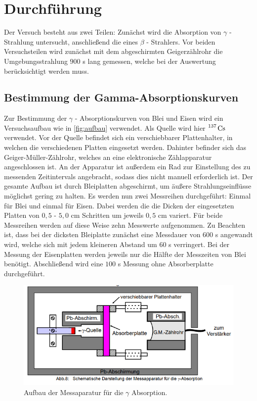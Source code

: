 \section{Durchführung}
\label{sec:Durchführung}
Der Versuch besteht aus zwei Teilen: Zunächst wird die Absorption von $\gamma$ - Strahlung untersucht, anschließend die eines $\beta$ - Strahlers.
Vor beiden Versuchsteilen wird zunächst mit dem abgeschirmten Geigerzählrohr die Umgebungsstrahlung $900$ s lang gemessen, welche bei der Auswertung 
berücksichtigt werden muss. 

\subsection{Bestimmung der Gamma-Absorptionskurven}
 Zur Bestimmung der $\gamma$ - Absorptionskurven von Blei und Eisen wird ein Versuchsaufbau wie in \autoref{fig:aufbau} verwendet. Als 
 Quelle wird hier $\ce{^{137} Cs}$ verwendet. Vor der Quelle befindet sich ein verschiebbarer Plattenhalter, in welchen die verschiedenen Platten
 eingesetzt werden. Dahinter befinder sich das Geiger-Müller-Zählrohr, welches an eine elektronische Zählapparatur angeschlossen ist. 
 An der Apparatur ist außerdem ein Rad zur Einstellung des zu messenden Zeitintervals angebracht, sodass dies nicht manuell erforderlich ist.
Der gesamte Aufbau ist durch Bleiplatten abgeschirmt, um äußere Strahlungseinflüsse möglichst gering zu halten. Es werden nun zwei Messreihen
durchgeführt: Einmal für Blei und einmal für Eisen. Dabei werden die die Dicken der eingesetzten Platten von $0,5$ - $5,0$ cm Schritten um
jeweils $0,5$ cm variert. Für beide Messreihen werden auf diese Weise zehn Messwerte aufgenommen. Zu Beachten ist, dass bei der dicksten Bleiplatte 
zunächst eine Messdauer von $600$ s angewandt wird, welche sich mit jedem kleineren Abstand um $60$ s verringert. Bei der Messung der Eisenplatten
werden jeweils nur die Hälfte der Messzeiten von Blei benötigt. Abschließend wird eine $100$ s Messung ohne Absorberplatte durchgeführt.
\begin{figure}
        \centering
        \includegraphics[width=\textwidth]{content/aufbau.png}
        \caption{Aufbau der Messaparatur für die $\gamma$ Absorption\cite[243]{V704}.}
        \label{fig:aufbau}
    \end{figure}